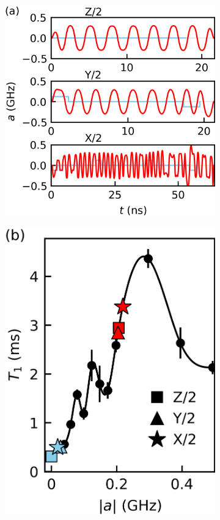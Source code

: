 \documentclass[
  amsfonts,
  amsmath,
  tbtags,
  amssymb,
  aps,
  nobibnotes,
  twocolumn,
  superscriptaddress,
]{revtex4-2}
\begin{document}
\begin{figure}[ht]
  \begin{subfigure}{.315\textwidth}
    \includegraphics[width=\linewidth]{assets/f1a.png}
  \end{subfigure}\hfill
  \begin{subfigure}{.23\textwidth}
    \includegraphics[width=\linewidth]{assets/f1b.png}

\end{subfigure}
\end{figure}
\end{document}
